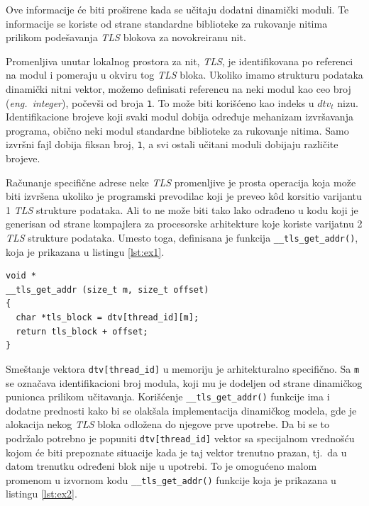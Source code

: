 \documentclass[12pt,oneside]{memoir}
\begin{document}
Ove informacije će biti proširene kada se učitaju dodatni dinamički moduli. Te informacije se koriste od strane standardne biblioteke za rukovanje nitima prilikom podešavanja \emph{TLS} blokova za novokreiranu nit.

Promenljiva unutar lokalnog prostora za nit, \emph{TLS}, je identifikovana po referenci na modul i pomeraju u okviru tog \emph{TLS} bloka. Ukoliko imamo strukturu podataka dinamički nitni vektor, možemo definisati referencu na neki modul kao ceo broj (\emph{eng.~integer}), počevši od broja \texttt{1}. To može biti korišćeno kao indeks u \texttt{$dtv_t$} nizu. Identifikacione brojeve koji svaki modul dobija određuje mehanizam izvršavanja programa, obično neki modul standardne biblioteke za rukovanje nitima. Samo izvršni fajl dobija fiksan broj, \texttt{1}, a svi ostali učitani moduli dobijaju različite brojeve.

Računanje specifične adrese neke \emph{TLS} promenljive je prosta operacija koja može biti izvršena ukoliko je programski prevodilac koji je preveo k\^{o}d korsitio varijantu 1 \emph{TLS} strukture podataka. Ali to ne može biti tako lako odrađeno u kodu koji je generisan od strane kompajlera za procesorske arhitekture koje koriste varijatnu 2 \emph{TLS} strukture podataka.
Umesto toga, definisana je funkcija \texttt{\_\_tls\_get\_addr()}, koja je prikazana u listingu \ref{lst:ex1}.\newpage

\begin{lstlisting}[style=customc, label={lst:ex1}, caption={Implementacija funkcije \texttt{\_\_tls\_get\_addr()}}]
void *
__tls_get_addr (size_t m, size_t offset)
{
  char *tls_block = dtv[thread_id][m];
  return tls_block + offset;
}

\end{lstlisting}

Smeštanje vektora \texttt{dtv[thread\_id]} u memoriju je arhitekturalno specifično. Sa \texttt{m} se označava identifikacioni broj modula, koji mu je dodeljen od strane dinamičkog punionca prilikom učitavanja. Korišćenje \texttt{\_\_tls\_get\_addr()} funkcije ima i dodatne prednosti kako bi se olakšala implementacija dinamičkog modela, gde je alokacija nekog \emph{TLS} bloka odložena do njegove prve upotrebe. Da bi se to podržalo potrebno je popuniti \texttt{dtv[thread\_id]} vektor sa specijalnom vrednošću kojom će biti prepoznate situacije kada je taj vektor trenutno prazan, tj.~da u datom trenutku određeni blok nije u upotrebi. To je omogućeno malom promenom u izvornom kodu \texttt{\_\_tls\_get\_addr()} funkcije koja je prikazana u listingu \ref{lst:ex2}.
\end{document}
